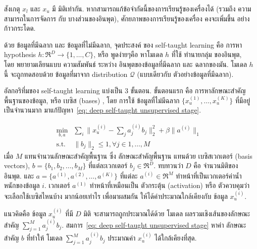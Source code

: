 สังเกตุ $x_l$ และ $x_u$ มี มิติเท่ากัน.
หากสามารถแก้ข้อจำกัดนี้ของการเรียนรู้ของเครื่องได้ (รวมถึง ความสามารถในการจัดการ กับ บางส่วนของอินพุต), ศักยภาพของการเรียนรู้ของเครื่อง คงจะเพิ่มขึ้น อย่างก้าวกระโดด.

ด้วย ข้อมูลที่มีฉลาก และ ข้อมูลที่ไม่มีฉลาก, จุดประสงค์ ของ self-taught learning คือ การหา hypothesis $h: \Re^D \rightarrow \{1, \ldots, C\}$,
 หรือ พูดง่ายๆคือ หาโมเดล $h$ ที่ใช้ ทำนายกลุ่ม ของอินพุต, 
 โดย พยายามเลียนแบบ ความสัมพันธ์ ระหว่าง อินพุตของข้อมูลที่มีฉลาก และ ฉลากของมัน.
โมเดล $h$ นี้ จะถูกทดสอบด้วย ข้อมูลที่มาจาก distribution $\mathcal{Q}$ (แบบเดียวกับ ตัวอย่างข้อมูลที่มีฉลาก).

อัลกอริทึ่มของ self-taught learning แบ่งเป็น $3$ ขั้นตอน.
ขั้นตอนแรก คือ การหาลักษณะสำคัญพื้นฐานของข้อมูล, หรือ เบซิส (bases) , โดย การใช้ ข้อมูลที่ไม่มีฉลาก $\{ x_u^{(1)}, \ldots, x_u^{(K)} \}$ ที่มีอยู่เป็นจำนวนมาก
มาแก้ปัญหา~\ref{eq: deep self-taught unsupervised stage}.

\begin{eqnarray}
  \min_{b,a} & \sum_i \| x_u^{(i)} - \sum_j a_j^{(i)} b_j \|_2^2 + \beta \| a^{(i)} \|_1
\label{eq: deep self-taught unsupervised stage} \\
  \mbox{s.t.} & \| b_j \|_2 \leq 1, \forall j \in 1, \ldots, M
\nonumber  
\end{eqnarray} 
เมื่อ $M$ แทนจำนวนลักษณะสำคัญพื้นฐาน ซึ่ง ลักษณะสำคัญพื้นฐาน แทนด้วย เบซิสเวกเตอร์ (basis vectors), $b = \{ b_1, b_2, \ldots, b_M \}$ ที่แต่ละเวกเตอร์ $b_j \in \Re^D$.
ทบทวนว่า $D$ คือ จำนวนมิติของอินพุต.
และ $a = \{ a^{(1)}, a^{(2)}, \ldots, a^{(K)} \}$ ที่แต่ละ $a^{(i)} \in \Re^M$ ทำหน้าที่เป็นเวกเตอร์ค่าน้ำหนักของข้อมูล $i$.
เวกเตอร์ $a^{(1)}$ ทำหน้าที่เหมือนเป็น ตัวกระตุ้น (activation) หรือ ตัวควบคุมว่าจะเลือกใช้เบซิสไหนบ้าง มากน้อยเท่าไร เพื่อมาผสมกัน ให้ได้ค่าประมาณใกล้เคียงกับ ข้อมูล $x_u^{(i)}$.

แนวคิดคือ ข้อมูล $x_u^{(i)}$ ที่มี $D$ มิติ จะสามารถถูกประมาณได้ด้วย โมเดล ผลรวมเชิงเส้นของลักษณะสำคัญ $\sum_{j=1}^M a_j^{(i)} b_j$.
สมการ~\ref{eq: deep self-taught unsupervised stage} หาค่า ลักษณะสำคัญ $b$ ที่ทำให้ โมเดล $\sum_{j=1}^M a_j^{(i)} b_j$ ประมาณค่า $x_u^{(i)}$ ได้ใกล้เคียงที่สุด.

